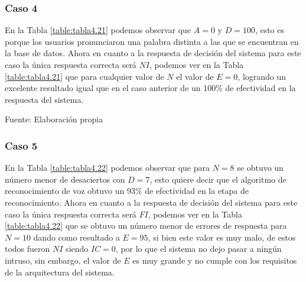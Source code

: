 \subsubsection{Caso 4}
En la Tabla \ref{table:tabla4.21} podemos observar que $A = 0$ y $D = 100$, esto es porque los usuarios pronunciaron una palabra distinta a las que se encuentran en la base de datos.
\vskip 0.5cm
Ahora en cuanto a la respuesta de decisión del sistema para este caso la única respuesta correcta será $NI$, podemos ver en la Tabla \ref{table:tabla4.21} que para cualquier valor de $N$ el valor de $E = 0$, logrando un excelente resultado igual que en el caso anterior de un 100\% de efectividad en la respuesta del sistema.

\begin{center}
\begin{table}[H]
\centering
\caption{\small{Resultados para el caso 4 con U1 dinámico.}}
\label{table:tabla4.21}
\vskip 0.2cm
\begin{center}
\vskip 0.2cm
{\small{Fuente: Elaboración propia}}
\end{center}
\end{table}
\end{center}

\subsubsection{Caso 5}
En la Tabla \ref{table:tabla4.22} podemos observar que para $N = 8$ se obtuvo un número menor de desaciertos con $D = 7$, esto quiere decir que el algoritmo de reconocimiento de voz obtuvo un 93\% de efectividad en la etapa de reconocimiento.
\vskip 0.5cm
Ahora en cuanto a la respuesta de decisión del sistema para este caso la única respuesta correcta será $FI$, podemos ver en la Tabla \ref{table:tabla4.22} que se obtuvo un número menor de errores de respuesta para $N = 10$ dando como resultado a $E = 95$, si bien este valor es muy malo, de estos todos fueron $NI$ siendo $IC = 0$, por lo que el sistema no dejo pasar a ningún intruso, sin embargo, el valor de $E$ es muy grande y no cumple con los requisitos de la arquitectura del sistema.

